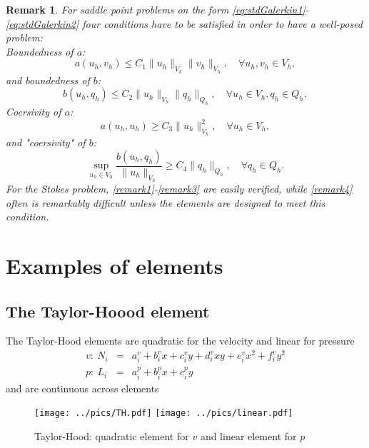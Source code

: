 \documentclass[a4paper,11pt]{amsart}
\newtheorem{remark}{Remark}[section]
\begin{document}
\begin{remark}
For saddle point problems on the form \eqref{eq:stdGalerkin1}-\eqref{eq:stdGalerkin2} four conditions
have to be satisfied in order to have a well-posed problem: \\
Boundedness of $a$:
\begin{equation}
\label{remark1}
a(u_h, v_h) \le C_1 \|u_h\|_{V_h} \|v_h\|_{V_h}, \quad \forall u_h, v_h \in V_h,
\end{equation}
and boundedness of $b$:
\begin{equation}
\label{remark2}
b(u_h, q_h) \le C_2 \|u_h\|_{V_h} \|q_h\|_{Q_h},  \quad \forall u_h \in V_h,  q_h \in Q_h,
\end{equation}
Coersivity of $a$:
\begin{equation}
\label{remark3}
a(u_h, u_h) \ge C_3 \|u_h\|^2_{V_h} , \quad \forall u_h \in V_h,
\end{equation}
and "coersivity" of $b$:
\begin{equation}
\label{remark4}
\sup_{u_h\in V_h} \frac{b(u_h, q_h)}{\|u_h\|_{V_h}} \ge C_4 \|q_h\|_{Q_h} , \quad \forall q_h \in Q_h.
\end{equation}
For the Stokes problem, \eqref{remark1}-\eqref{remark3} are easily verified, while \eqref{remark4} often
is remarkably difficult unless the elements are designed to meet this condition.
\end{remark}



\section{Examples of elements}
\subsection{The Taylor-Hoood element}
The Taylor-Hood elements are quadratic for the velocity and linear for pressure
\begin{eqnarray*}
v:\ N_i &=& a_i^v + b_i^vx + c_i^vy + d_i^vxy + e_i^vx^2 + f_i^vy^2 \\
p:\ L_i &=& a_i^p + b_i^px + c_i^py
\end{eqnarray*}
and are continuous across elements

\begin{figure}[h]
\begin{center}
\texttt{[image: ../pics/TH.pdf]}
\texttt{[image: ../pics/linear.pdf]}
\caption{Taylor-Hood: quadratic element for $v$ and linear element for $p$}
\end{center}
\end{figure}
\end{document}
